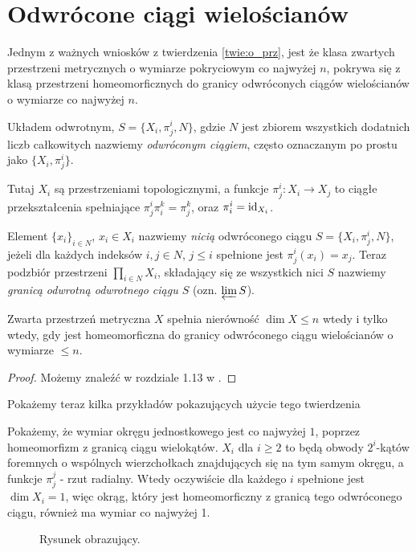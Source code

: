 \section{Odwrócone ciągi wielościanów}
Jednym z ważnych wniosków z twierdzenia \ref{twie:o_prz}, jest że klasa zwartych przestrzeni metrycznych o wymiarze pokryciowym co najwyżej $n$, pokrywa się z klasą przestrzeni homeomorficznych do granicy odwróconych ciągów wielościanów o wymiarze co najwyżej $n$. 
\begin{defi}
    Układem odwrotnym, $S = \{X_i, \pi_j^i, N\}$, gdzie $N$ jest zbiorem wszystkich dodatnich liczb całkowitych nazwiemy \emph{odwróconym ciągiem}, często oznaczanym po prostu jako $\{X_i, \pi_j^i\}$. \cite{engelking1989}
\end{defi}
Tutaj $X_i$ są przestrzeniami topologicznymi, a funkcje $\pi _j^i:X_i \rightarrow X_j$ to ciągłe przekształcenia spełniające $\pi _j^i \pi_i^k = \pi _j^k$, oraz $\pi _i^i=\operatorname{id}_{X_i}$.

\begin{defi}
    Element $\{x_i\}_{i\in N}$, $x_i \in X_i$ nazwiemy \emph{nicią} odwróconego ciągu 
    $S = \{X_i, \pi_j^i, N\}$, 
    jeżeli dla każdych indeksów $i, j\in N$, $j\le i$ spełnione jest $\pi _j^i(x_i)=x_j$. Teraz podzbiór przestrzeni $\prod_{i\in N}X_i$, składający się ze wszystkich nici $S$ nazwiemy \emph{granicą odwrotną odwrotnego ciągu $S$} (ozn. $\varprojlim S$).
\end{defi}

\begin{twie}
    Zwarta przestrzeń metryczna $X$ spełnia nierówność $\dim X\le n$ wtedy i tylko wtedy, gdy jest homeomorficzna do granicy odwróconego ciągu wielościanów o wymiarze $\le n$.
\end{twie}
\begin{proof}
    Możemy znaleźć w rozdziale 1.13 w \cite{engelking1995}.
\end{proof}

Pokażemy teraz kilka przykładów pokazujących użycie tego twierdzenia

\begin{przy}
    Pokażemy, że wymiar okręgu jednostkowego jest co najwyżej $1$, poprzez homeomorfizm z granicą ciągu wielokątów. $X_i$ dla $i\ge 2$ to będą obwody $2^i$-kątów foremnych o wspólnych wierzchołkach znajdujących się na tym samym okręgu, a funkcje $\pi_j^j$ - rzut radialny. Wtedy oczywiście dla każdego $i$ spełnione jest $\dim X_i = 1$, więc okrąg, który jest homeomorficzny z granicą tego odwróconego ciągu, również ma wymiar co najwyżej 1.
    \begin{figure}[H]
        \centering
        
        \caption{Rysunek obrazujący.}
        \label{fig:okrag}
    \end{figure}
    
\end{przy}

